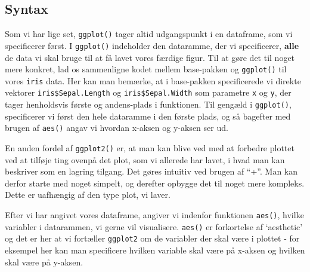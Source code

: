 \documentclass[
]{book}
\newenvironment{Shaded}{\begin{snugshade}}{\end{snugshade}}
\newcommand{\AttributeTok}[1]{\textcolor[rgb]{0.77,0.63,0.00}{#1}}
\newcommand{\CommentTok}[1]{\textcolor[rgb]{0.56,0.35,0.01}{\textit{#1}}}
\newcommand{\FunctionTok}[1]{\textcolor[rgb]{0.00,0.00,0.00}{#1}}
\newcommand{\NormalTok}[1]{#1}
\newcommand{\SpecialCharTok}[1]{\textcolor[rgb]{0.00,0.00,0.00}{#1}}
\begin{document}
\hypertarget{syntax}{%
\subsection{Syntax}\label{syntax}}

Som vi har lige set, \texttt{ggplot()} tager altid udgangspunkt i en dataframe, som vi specificerer først. I \texttt{ggplot()} indeholder den dataramme, der vi specificerer, \textbf{alle} de data vi skal bruge til at få lavet vores færdige figur. Til at gøre det til noget mere konkret, lad os sammenligne kodet mellem base-pakken og \texttt{ggplot()} til vores \texttt{iris} data. Her kan man bemærke, at i base-pakken specificerede vi direkte vektorer \texttt{iris\$Sepal.Length} og \texttt{iris\$Sepal.Width} som parametre \texttt{x} og \texttt{y}, der tager henholdsvis første og andens-plads i funktionen. Til gengæld i \texttt{ggplot()}, specificerer vi først den hele dataramme i den første plads, og så bagefter med brugen af \texttt{aes()} angav vi hvordan x-aksen og y-aksen ser ud.

\begin{Shaded}
\end{Shaded}

En anden fordel af \texttt{ggplot2()} er, at man kan blive ved med at forbedre plottet ved at tilføje ting ovenpå det plot, som vi allerede har lavet, i hvad man kan beskriver som en lagring tilgang. Det gøres intuitiv ved brugen af ``+''. Man kan derfor starte med noget simpelt, og derefter opbygge det til noget mere kompleks. Dette er uafhængig af den type plot, vi laver.

Efter vi har angivet vores dataframe, angiver vi indenfor funktionen \texttt{aes()}, hvilke variabler i datarammen, vi gerne vil visualisere. \texttt{aes()} er forkortelse af `aesthetic' og det er her at vi fortæller \texttt{ggplot2} om de variabler der skal være i plottet - for eksempel her kan man specificere hvilken variable skal være på x-aksen og hvilken skal være på y-aksen.
\end{document}
